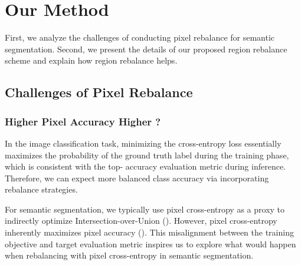 \documentclass[final]{cvpr}
\begin{document}
\section{Our Method}
First, we analyze the challenges of conducting pixel rebalance for semantic segmentation.
Second, we present the details of our proposed region rebalance scheme and explain how region rebalance helps.


\subsection{Challenges of Pixel Rebalance}
\label{sec:challenges_rebalance}

\subsubsection{Higher Pixel Accuracy  Higher ?} 
\label{sec:challenge1}
In the image classification task, minimizing the cross-entropy loss essentially maximizes the probability of the ground truth label during the training phase, which is consistent with the top- accuracy evaluation metric during inference.
Therefore, we can expect more balanced class accuracy via incorporating rebalance strategies.


For semantic segmentation, we typically use pixel cross-entropy as a proxy to indirectly optimize Intersection-over-Union (). However, pixel cross-entropy inherently maximizes pixel accuracy (). This misalignment between the training objective and target evaluation metric  inspires us to explore what would happen when rebalancing with pixel cross-entropy in semantic segmentation.
\end{document}
